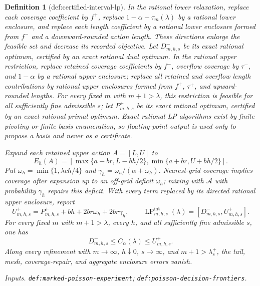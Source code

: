 \documentclass{article}
\newtheorem{definition}{Definition}
\begin{document}
\begin{definition}[def:certified-interval-lp]
In the rational lower relaxation, replace each coverage coefficient by
\(f^+\), replace \(1-\alpha-\tau_m(\lambda)\) by a rational lower
enclosure, and replace each length coefficient by a rational lower
enclosure formed from \(f^-\) and a downward-rounded action length.
These directions enlarge the feasible set and decrease its recorded
objective.  Let \(D_{m,h,s}^-\) be its exact rational optimum, certified
by an exact rational dual optimum.  In the rational upper restriction,
replace retained coverage coefficients by \(f^-\), overflow coverage
by \(\tau^-\), and \(1-\alpha\) by a rational upper enclosure; replace
all retained and overflow length contributions by rational upper
enclosures formed from \(f^+\), \(\tau^+\), and upward-rounded
lengths.  For every fixed \(m\) with \(m+1>\lambda\), this restriction
is feasible for all sufficiently fine admissible \(s\); let
\(P_{m,h,s}^+\) be its exact rational optimum, certified by an exact
rational primal optimum.  Exact rational LP algorithms exist by finite
pivoting or finite basis enumeration, so floating-point output is used
only to propose a basis and never as a certificate.

Expand each retained upper action \(A=[L,U]\) to
\[
 E_h(A)=[\max\{a-br,L-bh/2\},\min\{a+br,U+bh/2\}].
\]
Put \(\omega_h=\min\{1,\lambda ch/4\}\) and
\(\gamma_h=\omega_h/(\alpha+\omega_h)\).  Nearest-grid coverage
implies coverage after expansion up to an off-grid deficit
\(\omega_h\); mixing with \(\mathcal A\) with probability
\(\gamma_h\) repairs this deficit.  With every term replaced by its
directed rational upper enclosure, report
\[
 U_{m,h,s}^+=P_{m,h,s}^++bh+2br\omega_h+2br\gamma_h,
 \qquad
 \operatorname{LP}_{m,h,s}^{\mathrm{int}}(\lambda)
 =[D_{m,h,s}^-,U_{m,h,s}^+].
\]
For every fixed \(m\) with \(m+1>\lambda\), every \(h\), and all
sufficiently fine admissible \(s\), one has
\[
 D_{m,h,s}^-\le C_\alpha(\lambda)\le U_{m,h,s}^+.
\]
Along every refinement with \(m\to\infty\), \(h\downarrow0\),
\(s\to\infty\), and \(m+1>\lambda_s^+\), the tail, mesh,
coverage-repair, and aggregate enclosure errors vanish.
\par\smallskip\noindent\emph{Inputs.} \texttt{def:\allowbreak{}marked-\allowbreak{}poisson-\allowbreak{}experiment}; \texttt{def:\allowbreak{}poisson-\allowbreak{}decision-\allowbreak{}frontiers}.
\end{definition}
\end{document}
